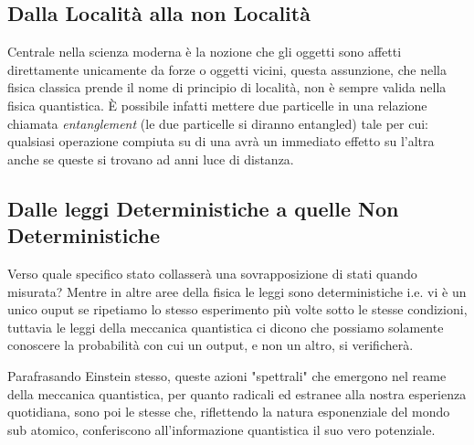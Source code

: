 \documentclass[12pt,a4paper,openright]{report}
\begin{document}
\subsection{Dalla Località alla non Località}
Centrale nella scienza moderna è la nozione che gli oggetti sono affetti direttamente unicamente da forze o oggetti vicini, questa assunzione, 
che nella fisica classica prende il nome di principio di località, non è sempre valida nella fisica quantistica. È possibile infatti
mettere due particelle in una relazione chiamata \emph{entanglement} (le due particelle si diranno entangled) tale per cui: qualsiasi
operazione compiuta su di una avrà un immediato effetto su l'altra anche se queste si trovano ad anni luce di distanza.    

\subsection{Dalle leggi Deterministiche a quelle Non Deterministiche}
Verso quale specifico stato collasserà una sovrapposizione di stati quando misurata? Mentre in altre aree della fisica le leggi sono deterministiche 
i.e. vi è un unico ouput se ripetiamo lo stesso esperimento più volte sotto le stesse condizioni, tuttavia le leggi della meccanica quantistica
ci dicono che possiamo solamente conoscere la probabilità con cui un output, e non un altro, si verificherà. \par

Parafrasando Einstein stesso, queste azioni "spettrali" che emergono nel reame della meccanica quantistica, per quanto radicali ed estranee
alla nostra esperienza quotidiana, sono poi le stesse che, riflettendo la natura esponenziale del mondo sub atomico, conferiscono all'informazione
quantistica il suo vero potenziale. 
\end{document}
